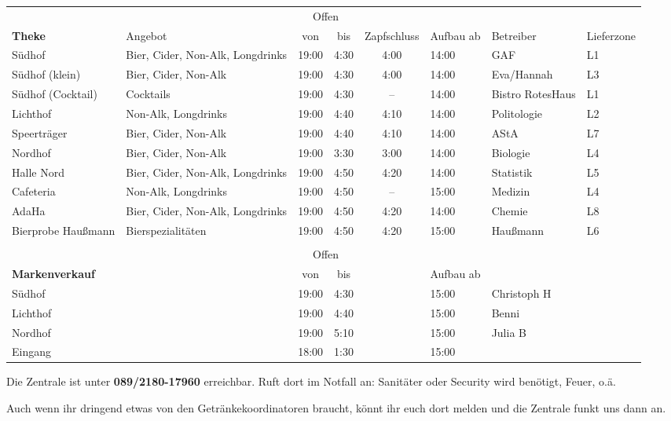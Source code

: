 \begin{center}
  \begin{tabular}{p{2cm}p{4cm}cccp{1.1cm}p{2.2cm}p{1cm}}
    & & \multicolumn{2}{c}{Offen} \\
    \multirow{-2}{*}{\textbf{Theke}} & \multirow{-2}{*}{Angebot} & von & bis & \multirow{-2}{*}{\parbox{1cm}{Zapf\-schluss}} & \multirow{-2}{*}{\parbox{1cm}{Aufbau ab}} & \multirow{-2}{*}{Betreiber} & \multirow{-2}{*}{\parbox{1cm}{Liefer\-zone}} \\ \hline \hline
    Südhof & Bier, Cider, Non-Alk, Longdrinks & 19:00 & 4:30 & 4:00 & 14:00 & GAF & L1 \\ \hline
    Südhof (klein) & Bier, Cider, Non-Alk & 19:00 & 4:30 & 4:00 & 14:00 & Eva/Hannah & L3 \\ \hline
    Südhof (Cocktail) & Cocktails & 19:00 & 4:30 & -- & 14:00 & Bistro RotesHaus & L1 \\ \hline
    Lichthof & Non-Alk, Longdrinks & 19:00 & 4:40 & 4:10 & 14:00 & Politologie & L2 \\ \hline
    Speerträger & Bier, Cider, Non-Alk & 19:00 & 4:40 & 4:10 & 14:00 & AStA & L7 \\ \hline
    Nordhof & Bier, Cider, Non-Alk & 19:00 & 3:30 & 3:00 & 14:00 & Biologie & L4 \\ \hline
    Halle Nord & Bier, Cider, Non-Alk, Longdrinks & 19:00 & 4:50 & 4:20 & 14:00 & Statistik & L5 \\ \hline
    Cafeteria & Non-Alk, Longdrinks & 19:00 & 4:50 & -- & 15:00 & Medizin & L4 \\ \hline %
    AdaHa & Bier, Cider, Non-Alk, Longdrinks & 19:00 & 4:50 & 4:20 & 14:00 & Chemie & L8 \\ \hline
    Bierprobe Haußmann & Bierspezialitäten & 19:00 & 4:50 & 4:20 & 15:00 & Haußmann & L6 \\ \\
                        & & \multicolumn{2}{c}{Offen} \\
    \multirow{-2}{*}{\textbf{Markenverkauf}} & & von & bis & & \multirow{-2}{*}{\parbox{1cm}{Aufbau ab}} \\ \hline \hline
      Südhof & & 19:00 & 4:30 & & 15:00 & Christoph H \\
      Lichthof & & 19:00 & 4:40 & & 15:00 & Benni \\
      Nordhof & & 19:00 & 5:10 & & 15:00 & Julia B \\
      Eingang & & 18:00 & 1:30 & & 15:00
  \end{tabular}
\end{center}

Die Zentrale ist unter \textbf{089/2180-17960} erreichbar. Ruft dort im Notfall an: Sanitäter oder Security wird benötigt, Feuer, o.ä.

Auch wenn ihr dringend etwas von den Getränkekoordinatoren braucht, könnt ihr euch dort melden und die Zentrale funkt uns dann an.
